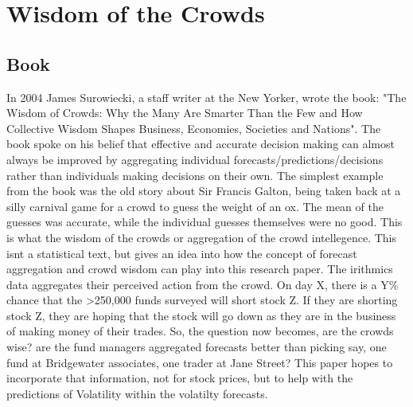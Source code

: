 \section{Wisdom of the Crowds}
\subsection{Book}
In 2004 James Surowiecki, a staff writer at the New Yorker, wrote the book: "The Wisdom of Crowds: Why the Many Are Smarter Than the Few and How Collective Wisdom Shapes Business, Economies, Societies and Nations". The book spoke on his belief that effective and accurate decision making can almost always be improved by aggregating individual forecasts/predictions/decisions rather than individuals making decisions on their own. The simplest example from the book was the old story about Sir Francis Galton, being taken back at a silly carnival game for a crowd to guess the weight of an ox. The mean of the guesses was accurate, while the individual guesses themselves were no good. This is what the wisdom of the crowds or aggregation of the crowd intellegence. This isnt a statistical text, but gives an idea into how the concept of forecast aggregation and crowd wisdom can play into this research paper. The irithmics data aggregates their perceived action from the crowd. On day X, there is a Y\% chance that the >250,000 funds surveyed will short stock Z. If they are shorting stock Z, they are hoping that the stock will go down as they are in the business of making money of their trades. So, the question now becomes, are the crowds wise? are the fund managers aggregated forecasts better than picking say, one fund at Bridgewater associates, one trader at Jane Street? This paper hopes to incorporate that information, not for stock prices, but to help with the predictions of Volatility within the volatilty forecasts.   

